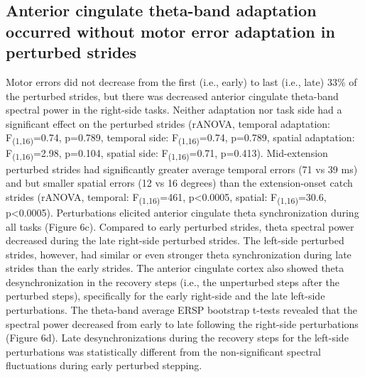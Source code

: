 \documentclass[shortpaper,twoside,web]{ieeecolor}
\newcommand{\tsu}[1]{\textsubscript{#1}}
\begin{document}
\subsection{Anterior cingulate theta-band adaptation occurred without motor error adaptation in perturbed strides}
Motor errors did not decrease from the first (i.e., early) to last (i.e., late) 33\% of the perturbed strides, but there was decreased anterior cingulate theta-band spectral power in the right-side tasks. Neither adaptation nor task side had a significant effect on the perturbed strides (rANOVA, temporal adaptation: F\tsu{(1,16)}=0.74, p=0.789, temporal side: F\tsu{(1,16)}=0.74, p=0.789, spatial adaptation: F\tsu{(1,16)}=2.98, p=0.104, spatial side: F\tsu{(1,16)}=0.71, p=0.413). Mid-extension perturbed strides had significantly greater average temporal errors (71 vs 39 ms) and but smaller spatial errors (12 vs 16 degrees) than the extension-onset catch strides (rANOVA, temporal: F\tsu{(1,16)}=461, p<0.0005, spatial: F\tsu{(1,16)}=30.6, p<0.0005). Perturbations elicited anterior cingulate theta synchronization during all tasks (Figure 6c). Compared to early perturbed strides, theta spectral power decreased during the late right-side perturbed strides. The left-side perturbed strides, however, had similar or even stronger theta synchronization during late strides than the early strides. The anterior cingulate cortex also showed theta desynchronization in the recovery steps (i.e., the unperturbed steps after the perturbed steps), specifically for the early right-side and the late left-side perturbations. The theta-band average ERSP bootstrap t-tests revealed that the spectral power decreased from early to late following the right-side perturbations (Figure 6d). Late desynchronizations during the recovery steps for the left-side perturbations was statistically different from the non-significant spectral fluctuations during early perturbed stepping.
\end{document}
